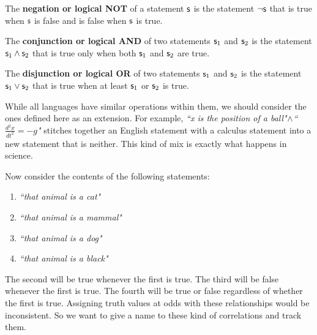 \documentclass[11pt,letterpaper,fleqn]{memoir} %
\begin{document}
\begin{mathSection}
\begin{defn}
	The \textbf{negation or logical NOT} of a statement $\mathsf{s}$ is the statement $\neg\mathsf{s}$ that is true when $\mathsf{s}$ is false and is false when $\mathsf{s}$ is true.
\end{defn}

\begin{defn}
	The \textbf{conjunction or logical AND} of two statements $\mathsf{s}_1$ and $\mathsf{s}_2$ is the statement $\mathsf{s}_1 \wedge \mathsf{s}_2$ that is true only when both $\mathsf{s}_1$ and $\mathsf{s}_2$ are true.
\end{defn}

\begin{defn}
	The \textbf{disjunction or logical OR} of two statements $\mathsf{s}_1$ and $\mathsf{s}_2$ is the statement $\mathsf{s}_1 \vee \mathsf{s}_2$ that is true when at least  $\mathsf{s}_1$ or $\mathsf{s}_2$ is true.
\end{defn}
\end{mathSection}

While all languages have similar operations within them, we should consider the ones defined here as an extension. For example, \emph{``x is the position of a ball"}$\wedge$\emph{``$\frac{d^2 x}{dt^2} = - g$"} stitches together an English statement with a calculus statement into a new statement that is neither. This kind of mix is exactly what happens in science.

Now consider the contents of the following statements:
\begin{enumerate}
	\item \emph{``that animal is a cat"}
	\item \emph{``that animal is a mammal"}
	\item \emph{``that animal is a dog"}
	\item \emph{``that animal is a black"}
\end{enumerate}
The second will be true whenever the first is true. The third will be false whenever the first is true. The fourth will be true or false regardless of whether the first is true. Assigning truth values at odds with these relationships would be inconsistent. So we want to give a name to these kind of correlations and track them.
\end{document}
